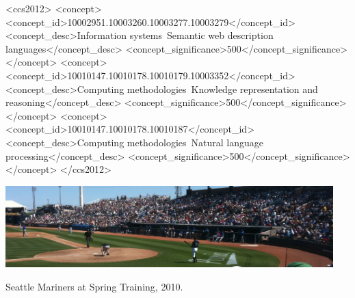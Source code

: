 \documentclass[sigconf,anonymous]{acmart}
\begin{document}
\begin{CCSXML}
<ccs2012>
   <concept>
       <concept_id>10002951.10003260.10003277.10003279</concept_id>
       <concept_desc>Information systems~Semantic web description languages</concept_desc>
       <concept_significance>500</concept_significance>
   </concept>
   <concept>
       <concept_id>10010147.10010178.10010179.10003352</concept_id>
       <concept_desc>Computing methodologies~Knowledge representation and reasoning</concept_desc>
       <concept_significance>500</concept_significance>
   </concept>
   <concept>
       <concept_id>10010147.10010178.10010187</concept_id>
       <concept_desc>Computing methodologies~Natural language processing</concept_desc>
       <concept_significance>500</concept_significance>
   </concept>
</ccs2012>
\end{CCSXML}



\begin{teaserfigure}
  \includegraphics[width=0.95\textwidth]{sampleteaser}
  \caption{Seattle Mariners at Spring Training, 2010.}
  \label{fig:teaser}
\end{teaserfigure}

\maketitle
\clearpage
\end{document}
